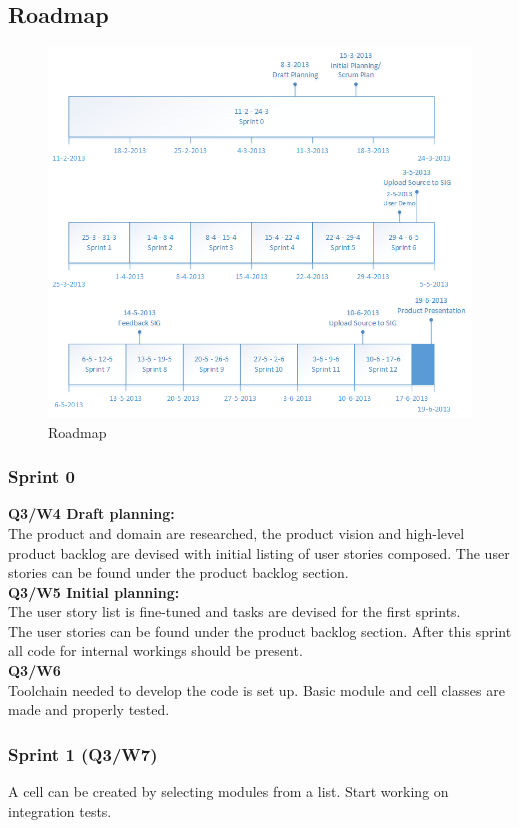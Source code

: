 \documentclass[10pt,a4paper]{report}
\begin{document}
		\subsection{Roadmap}
			\begin{figure}[htb]
			\centerline{\includegraphics[scale=0.8]{Roadmap.png}}
			\caption{Roadmap}
			\label{fig: Roadmap}
			\end{figure}	
			\subsubsection*{Sprint 0}
				\textbf{Q3/W4 Draft planning:}\\ The product and domain are researched, the product vision and high-level product backlog are devised with initial listing of user stories composed. The user stories can be found under the product backlog section.\\
				\textbf{Q3/W5 Initial planning:}\\ The user story list is fine-tuned and tasks are devised for the first sprints.\\
				The user stories can be found under the product backlog section. After this sprint all code for internal workings should be present.\\		
				\textbf{Q3/W6}\\
				Toolchain needed to develop the code is set up. Basic module and cell classes are made and properly tested.
			\subsubsection*{Sprint 1 (Q3/W7)}
				A cell can be created by selecting modules from a list. Start working on integration tests.
\end{document}
